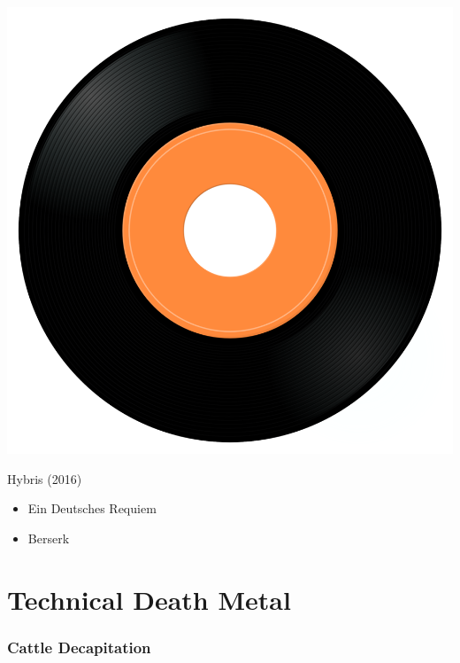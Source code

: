 \begin{minipage}[t]{0.25\textwidth}\vspace{0pt}
\captionsetup{type=figure}
\includegraphics[width=\textwidth]{Images/cover.png}
\caption*{Hybris (2016)}
\end{minipage}
\begin{minipage}[t]{0.25\textwidth}\vspace{0pt}
\begin{itemize}[nosep,leftmargin=1em,labelwidth=*,align=left]
	\setlength{\itemsep}{0pt}
	\item Ein Deutsches Requiem
	\item Berserk
\end{itemize}
\end{minipage}

\cleardoublepage
\section{Technical Death Metal}

\subsubsection{Cattle Decapitation}

